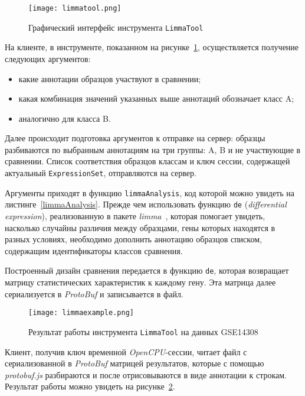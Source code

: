 \begin{figure}[h]
  \caption{Графический интерфейс инструмента \texttt{LimmaTool}}
  \texttt{[image: limmatool.png]}
  \label{limmatool}
\end{figure}

На клиенте, в инструменте, показанном на рисунке~\ref{limmatool}, осуществляется получение следующих аргументов:
\begin{itemize}
\item какие аннотации образцов участвуют в сравнении;
\item какая комбинация значений указанных выше аннотаций обозначает класс A;
\item аналогично для класса B.
\end{itemize}

Далее происходит подготовка аргументов к отправке на сервер: образцы разбиваются по выбранным аннотациям на три группы: A, B и не участвующие в сравнении.
Список соответствия образцов классам и ключ сессии, содержащей актуальный \texttt{ExpressionSet}, отправляются на сервер.

Аргументы приходят в функцию \texttt{limmaAnalysis}, код которой можно увидеть на листинге~\ref{limmaAnalysis}. Прежде чем использовать функцию \texttt{de} (\emph{differential expression}), реализованную в пакете \emph{limma}~\cite{limma}, которая помогает увидеть, насколько случайны различия между образцами, гены которых находятся в разных условиях, необходимо дополнить аннотацию образцов списком, содержащим идентификаторы классов сравнения.

Построенный дизайн сравнения передается в функцию \texttt{de}, которая возвращает матрицу статистических характеристик к каждому гену.
Эта матрица далее сериализуется в \emph{ProtoBuf} и записывается в файл.

\begin{figure}[h]
  \caption{Результат работы инструмента \texttt{LimmaTool} на данных GSE14308}
  \texttt{[image: limmaexample.png]}
  \label{limmaexample}
\end{figure}

Клиент, получив ключ временной \emph{OpenCPU}-сессии, читает файл с сериализованной в \emph{ProtoBuf} матрицей результатов, которые с помощью \emph{protobuf.js} разбираются и после отрисовываются в виде аннотации к строкам. Результат работы можно увидеть на рисунке~\ref{limmaexample}.


